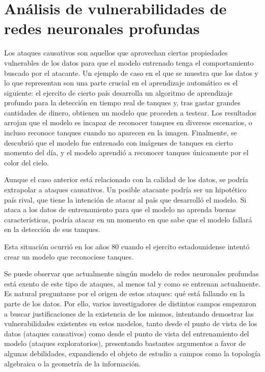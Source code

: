 
\chapter{Análisis de vulnerabilidades de redes neuronales profundas}
\label{cap:capitulo2}

Los ataques causativos son aquellos que aprovechan ciertas propiedades vulnerables de los datos para que el modelo entrenado tenga el comportamiento buscado por el atacante. Un ejemplo de caso en el que se muestra que los datos y lo que representan son una parte crucial en el aprendizaje automático es el siguiente: el ejercito de cierto país desarrolla un algoritmo de aprendizaje profundo para la detección en tiempo real de tanques y, tras gastar grandes cantidades de dinero, obtienen un modelo que proceden a testear. Los resultados arrojan que el modelo es incapaz de reconocer tanques en diversos escenarios, o incluso reconoce tanques cuando no aparecen en la imagen. Finalmente, se descubrió que el modelo fue entrenado con imágenes de tanques en cierto momento del día, y el modelo aprendió a reconocer tanques únicamente por el color del cielo.

Aunque el caso anterior está relacionado con la calidad de los datos, se podría extrapolar a ataques causativos. Un posible atacante podría ser un hipotético país rival, que tiene la intención de atacar al país que desarrolló el modelo. Si ataca a los datos de entrenamiento para que el modelo no aprenda buenas características, podría atacar en un momento en que sabe que el modelo fallará en la detección de sus tanques.

Esta situación ocurrió en los años 80 cuando el ejercito estadounidense intentó crear un modelo que reconociese tanques.%

Se puede observar que actualmente ningún modelo de redes neuronales profundas está exento de este tipo de ataques, al menos tal y como se entrenan actualmente. Es natural preguntarse por el origen de estos ataques: qué está fallando en la parte de los datos. Por ello, varios investigadores de distintos campos empezaron a buscar justificaciones de la existencia de los mismos, intentando demostrar las vulnerabilidades existentes en estos modelos, tanto desde el punto de vista de los datos (ataques causativos) como desde el punto de vista del entrenamiento del modelo (ataques exploratorios), presentando bastantes argumentos a favor de algunas debilidades, expandiendo el objeto de estudio a campos como la topología algebraica o la geometría de la información.

